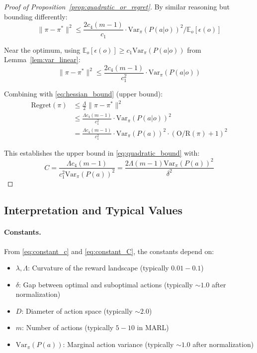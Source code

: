 \begin{proof}[Proof of Proposition~\ref{prop:quadratic_or_regret}]
By similar reasoning but bounding differently:
\begin{equation}
    \|\pi - \pi^*\|^2 \le \frac{2c_4(m-1)}{c_1} \cdot \text{Var}_{\pi}(P(a|o))^2 / \mathbb{E}_o[\epsilon(o)]
\end{equation}

Near the optimum, using $\mathbb{E}_o[\epsilon(o)] \ge c_1 \text{Var}_{\pi}(P(a|o))$ from Lemma~\ref{lem:var_linear}:
\begin{equation}
    \|\pi - \pi^*\|^2 \le \frac{2c_4(m-1)}{c_1^2} \cdot \text{Var}_{\pi}(P(a|o))
\end{equation}

Combining with \eqref{eq:hessian_bound} (upper bound):
\begin{align}
    \text{Regret}(\pi) &\le \frac{\Lambda}{2} \|\pi - \pi^*\|^2 \\
    &\le \frac{\Lambda c_4 (m-1)}{c_1^2} \cdot \text{Var}_{\pi}(P(a|o))^2 \\
    &= \frac{\Lambda c_4 (m-1)}{c_1^2} \cdot \text{Var}_{\pi}(P(a))^2 \cdot (\text{O/R}(\pi) + 1)^2
\end{align}

This establishes the upper bound in \eqref{eq:quadratic_bound} with:
\begin{equation}
    C = \frac{\Lambda c_4 (m-1)}{c_1^2 \text{Var}_{\pi}(P(a))^2} = \frac{2\Lambda (m-1) \text{Var}_{\pi}(P(a))^2}{\delta^2}
    \label{eq:constant_C}
\end{equation}
\end{proof}

\subsection{Interpretation and Typical Values}

\paragraph{Constants.} From \eqref{eq:constant_c} and \eqref{eq:constant_C}, the constants depend on:
\begin{itemize}
    \item $\lambda, \Lambda$: Curvature of the reward landscape (typically $0.01 - 0.1$)
    \item $\delta$: Gap between optimal and suboptimal actions (typically $\sim 1.0$ after normalization)
    \item $D$: Diameter of action space (typically $\sim 2.0$)
    \item $m$: Number of actions (typically $5 - 10$ in MARL)
    \item $\text{Var}_{\pi}(P(a))$: Marginal action variance (typically $\sim 1.0$ after normalization)
\end{itemize}

